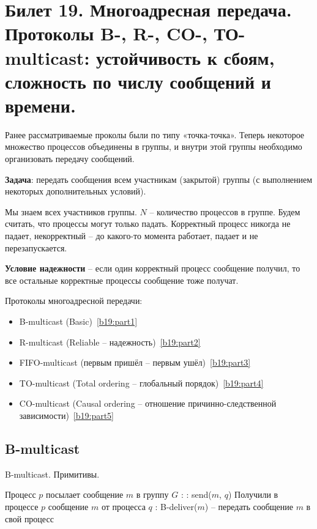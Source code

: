 \newpage
\section{Билет 19. Многоадресная передача. Протоколы B-, R-, CO-, ТО-multicast: устойчивость к сбоям, сложность по числу сообщений и времени.}

Ранее рассматриваемые проколы были по типу «точка-точка».
Теперь некоторое множество процессов объединены в группы, и внутри этой группы необходимо организовать передачу сообщений.

\textbf{Задача}: передать сообщения всем участникам (закрытой) группы (с выполнением некоторых дополнительных условий).

Мы знаем всех участников группы. $N$ -- количество процессов в группе. Будем считать, что процессы могут только падать.
Корректный процесс никогда не падает, некорректный -- до какого-то момента работает, падает и не перезапускается.

\textbf{Условие надежности} -- если один корректный процесс сообщение получил, то все остальные корректные процессы сообщение тоже получат.
\bigskip

Протоколы многоадресной передачи:
\begin{itemize}
	\item B-multicast (Basic)~\ref{b19:part1}
	\item R-multicast (Reliable -- надежность)~\ref{b19:part2}
	\item FIFO-multicast (первым пришёл -- первым ушёл)~\ref{b19:part3}
	\item TO-multicast (Total ordering -- глобальный порядок)~\ref{b19:part4}
	\item CO-multicast (Causal ordering -- отношение причинно-следственной зависимости)~\ref{b19:part5}
\end{itemize}

\newpage
\subsection*{B-multicast}\label{b19:part1}

\begin{algorithm}[h!]
\caption{B-multicast. Примитивы.}
\begin{algorithmic}

\State Процесс $p$ посылает сообщение $m$ в группу $G$
:
	:
		\State send($m$, $q$)
	\EndFor
\EndProcedure
\State
\State Получили в процессе $p$ сообщение $m$ от процесса $q$
:
	\State B-deliver($m$) -- передать сообщение $m$ в свой процесс
\EndProcedure

\end{algorithmic}
\end{algorithm}

